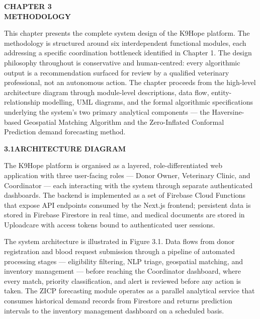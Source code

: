 \documentclass[12pt,a4paper]{article}
\begin{document}
\newpage
\begin{center}
    \textbf{\large CHAPTER 3}\\[0.4em]
    \textbf{\large METHODOLOGY}
\end{center}
\vspace{1.5em}

\noindent This chapter presents the complete system design of the K9Hope platform. The methodology is structured around six interdependent functional modules, each addressing a specific coordination bottleneck identified in Chapter 1. The design philosophy throughout is conservative and human-centred: every algorithmic output is a recommendation surfaced for review by a qualified veterinary professional, not an autonomous action. The chapter proceeds from the high-level architecture diagram through module-level descriptions, data flow, entity-relationship modelling, UML diagrams, and the formal algorithmic specifications underlying the system's two primary analytical components — the Haversine-based Geospatial Matching Algorithm and the Zero-Inflated Conformal Prediction demand forecasting method.

\vspace{2em}
\noindent\textbf{3.1\quad ARCHITECTURE DIAGRAM}
\vspace{0.8em}

\noindent The K9Hope platform is organised as a layered, role-differentiated web application with three user-facing roles — Donor Owner, Veterinary Clinic, and Coordinator — each interacting with the system through separate authenticated dashboards. The backend is implemented as a set of Firebase Cloud Functions that expose API endpoints consumed by the Next.js frontend; persistent data is stored in Firebase Firestore in real time, and medical documents are stored in Uploadcare with access tokens bound to authenticated user sessions.

\noindent The system architecture is illustrated in Figure 3.1. Data flows from donor registration and blood request submission through a pipeline of automated processing stages — eligibility filtering, NLP triage, geospatial matching, and inventory management — before reaching the Coordinator dashboard, where every match, priority classification, and alert is reviewed before any action is taken. The ZICP forecasting module operates as a parallel analytical service that consumes historical demand records from Firestore and returns prediction intervals to the inventory management dashboard on a scheduled basis.
\end{document}
